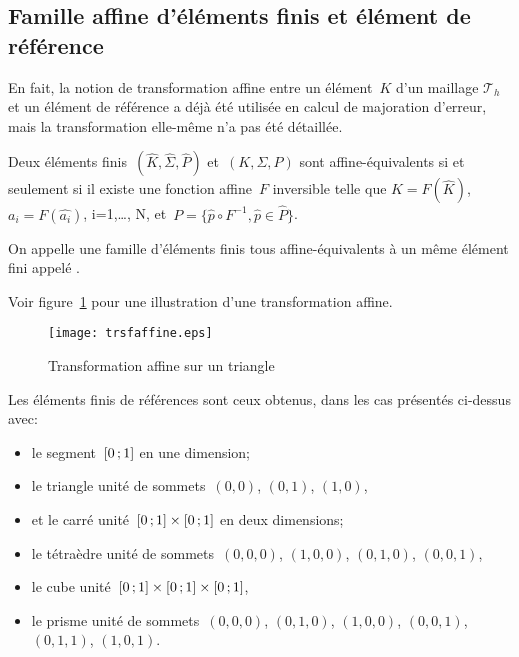 \medskip
\subsection{Famille affine d'éléments finis et élément de référence}
En fait, la notion de transformation affine entre un élément~$K$ d'un maillage $\mathcal{T}_h$ et un élément de référence a déjà été utilisée en calcul de majoration d'erreur, mais la transformation elle-même n'a pas été détaillée.

\medskip{}
Deux éléments finis~$(\hat{K}, \hat{\Sigma}, \hat{P})$ et~$(K, \Sigma, P)$ sont affine-équivalents si et seulement si il existe une fonction affine~$F$ inversible telle que 
$K=F(\hat{K})$, $a_i=F(\hat{a_i})$, i=1,\ldots, N, et~$P=\{\hat{p}\circ F^{-1}, \hat{p}\in\hat{P}\}$.
\normalsize

\medskip
\begin{definition}
On appelle  une famille d'éléments finis tous affine-équivalents à un même élément fini appelé .
\end{definition}
\medskip
{}
Voir figure~\ref{trsfaffine} pour une illustration d'une transformation affine.
\begin{figure}[h!]
\centering
\texttt{[image: trsfaffine.eps]}
\caption{\label{trsfaffine} Transformation affine sur un triangle}
\end{figure}
\medskip
Les éléments finis de références sont ceux obtenus, dans les cas présentés ci-dessus avec:
\begin{itemize}
\item le segment~$\mathopen{[}0\,;1\mathclose{]}$ en une dimension;
\item le triangle unité de sommets~$(0,0)$, $(0,1)$, $(1,0)$,
\item et le carré unité~$\mathopen{[}0\,;1\mathclose{]}\times\mathopen{[}0\,;1\mathclose{]}$ en deux dimensions;
\item le tétraèdre unité de sommets~$(0,0,0)$, $(1,0,0)$, $(0,1,0)$, $(0,0,1)$,
\item le cube unité~$\mathopen{[}0\,;1\mathclose{]}\times\mathopen{[}0\,;1\mathclose{]}\times\mathopen{[}0\,;1\mathclose{]}$,
\item le prisme unité de sommets~$(0,0,0)$, $(0,1,0)$, $(1,0,0)$, $(0,0,1)$, $(0,1,1)$, $(1,0,1)$.
\end{itemize}

